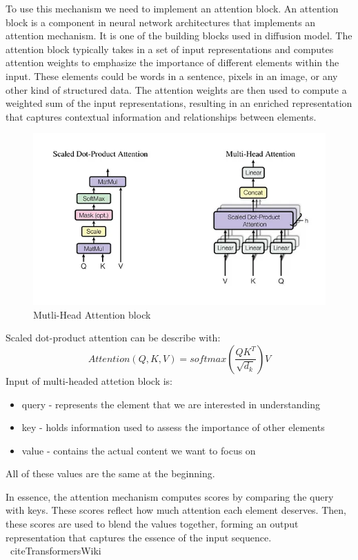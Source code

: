 \documentclass[11pt,a4paper]{report}
\begin{document}
To use this mechanism we need to implement  an attention block. An attention block is a component in neural network architectures that implements an attention mechanism. It is one of the building blocks used in diffusion model. The attention block typically takes in a set of input representations and computes attention weights to emphasize the importance of different elements within the input. These elements could be words in a sentence, pixels in an image, or any other kind of structured data. The attention weights are then used to compute a weighted sum of the input representations, resulting in an enriched representation that captures contextual information and relationships between elements.

\begin{figure}[H]
	\centering
	\includegraphics[width=\textwidth]{images/multi_headed}
    \caption{Mutli-Head Attention block \cite{AttentionIsAll}}
\end{figure}

Scaled dot-product attention can be describe with:
\[Attention(Q,K,V) = softmax(\frac{QK^T}{\sqrt{d_k}})V\]
Input of multi-headed attetion block is:
\begin{itemize}
\item query - represents the element that we are interested in understanding
\item key - holds information used to assess the importance of other elements
\item value - contains the actual content we want to focus on
\end{itemize}
All of these values are the same at the beginning.

In essence, the attention mechanism computes scores by comparing the query with keys. These scores reflect how much attention each element deserves. Then, these scores are used to blend the values together, forming an output representation that captures the essence of the input sequence. \cite{AttentionIsAll} \cite{AttentionWiki}\ cite{TransformersWiki}
\end{document}
